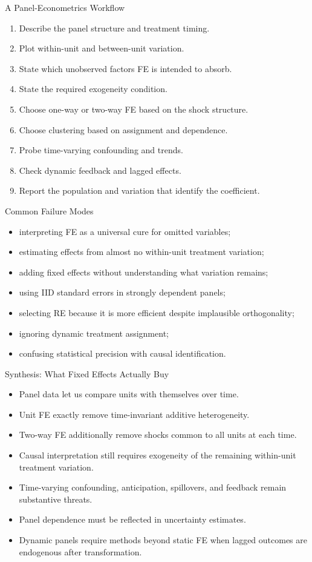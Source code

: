 \documentclass[aspectratio=169,11pt]{beamer}
\begin{document}
\begin{frame}{A Panel-Econometrics Workflow}
\begin{enumerate}
\item Describe the panel structure and treatment timing.
\item Plot within-unit and between-unit variation.
\item State which unobserved factors FE is intended to absorb.
\item State the required exogeneity condition.
\item Choose one-way or two-way FE based on the shock structure.
\item Choose clustering based on assignment and dependence.
\item Probe time-varying confounding and trends.
\item Check dynamic feedback and lagged effects.
\item Report the population and variation that identify the coefficient.
\end{enumerate}
\end{frame}

\begin{frame}{Common Failure Modes}
\begin{itemize}
\item interpreting FE as a universal cure for omitted variables;
\item estimating effects from almost no within-unit treatment variation;
\item adding fixed effects without understanding what variation remains;
\item using IID standard errors in strongly dependent panels;
\item selecting RE because it is more efficient despite implausible orthogonality;
\item ignoring dynamic treatment assignment;
\item confusing statistical precision with causal identification.
\end{itemize}
\end{frame}

\begin{frame}{Synthesis: What Fixed Effects Actually Buy}
\begin{itemize}
\item Panel data let us compare units with themselves over time.
\item Unit FE exactly remove time-invariant additive heterogeneity.
\item Two-way FE additionally remove shocks common to all units at each time.
\item Causal interpretation still requires exogeneity of the remaining within-unit treatment variation.
\item Time-varying confounding, anticipation, spillovers, and feedback remain substantive threats.
\item Panel dependence must be reflected in uncertainty estimates.
\item Dynamic panels require methods beyond static FE when lagged outcomes are endogenous after transformation.
\end{itemize}
\end{frame}
\end{document}
